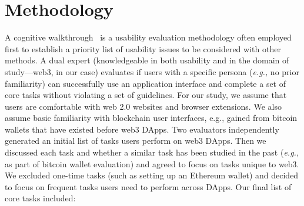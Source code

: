 \documentclass[conference]{IEEEtran}
\begin{document}









\section{Methodology}

A cognitive walkthrough~\cite{wharton1994cognitive} is a usability evaluation methodology often employed first to establish a priority list of usability issues to be considered with other methods. A dual expert (knowledgeable in both usability and in the domain of study---web3, in our case) evaluates if users with a specific persona (\textit{e.g.,} no prior familiarity) can successfully use an application interface and complete a set of core tasks without violating a set of guidelines.
For our study, we assume that users are comfortable with web 2.0 websites and browser extensions.
We also assume basic familiarity with blockchain user interfaces, e.g., gained from bitcoin wallets that have existed before web3 DApps.
Two evaluators independently generated an initial list of tasks users perform on web3 DApps. Then we discussed each task and whether a similar task has been studied in the past (\textit{e.g.,} as part of bitcoin wallet evaluation) and agreed to focus on tasks unique to web3.
We excluded one-time tasks (such as setting up an Ethereum wallet) and decided to focus on frequent tasks users need to perform across DApps.
Our final list of core tasks included:
\end{document}
